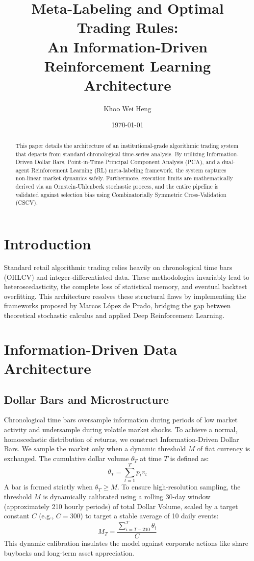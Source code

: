 \documentclass[12pt, a4paper]{article}
\title{\textbf{Meta-Labeling and Optimal Trading Rules:\\ An Information-Driven Reinforcement Learning Architecture}}
\author{Khoo Wei Heng}
\date{\today}
\begin{document}
\maketitle

\begin{abstract}
This paper details the architecture of an institutional-grade algorithmic trading system that departs from standard chronological time-series analysis. By utilizing Information-Driven Dollar Bars, Point-in-Time Principal Component Analysis (PCA), and a dual-agent Reinforcement Learning (RL) meta-labeling framework, the system captures non-linear market dynamics safely. Furthermore, execution limits are mathematically derived via an Ornstein-Uhlenbeck stochastic process, and the entire pipeline is validated against selection bias using Combinatorially Symmetric Cross-Validation (CSCV).
\end{abstract}

\section{Introduction}
Standard retail algorithmic trading relies heavily on chronological time bars (OHLCV) and integer-differentiated data. These methodologies invariably lead to heteroscedasticity, the complete loss of statistical memory, and eventual backtest overfitting. This architecture resolves these structural flaws by implementing the frameworks proposed by Marcos López de Prado, bridging the gap between theoretical stochastic calculus and applied Deep Reinforcement Learning.

\section{Information-Driven Data Architecture}

\subsection{Dollar Bars and Microstructure}
Chronological time bars oversample information during periods of low market activity and undersample during volatile market shocks. To achieve a normal, homoscedastic distribution of returns, we construct Information-Driven Dollar Bars. We sample the market only when a dynamic threshold $M$ of fiat currency is exchanged. The cumulative dollar volume $\theta_T$ at time $T$ is defined as:
$$ \theta_T = \sum_{t=1}^{T} p_t v_t $$
A bar is formed strictly when $\theta_T \geq M$. To ensure high-resolution sampling, the threshold $M$ is dynamically calibrated using a rolling 30-day window (approximately 210 hourly periods) of total Dollar Volume, scaled by a target constant $C$ (e.g., $C = 300$) to target a stable average of 10 daily events:
$$ M_T = \frac{\sum_{i=T-210}^{T} \theta_i}{C} $$
This dynamic calibration insulates the model against corporate actions like share buybacks and long-term asset appreciation.
\end{document}
